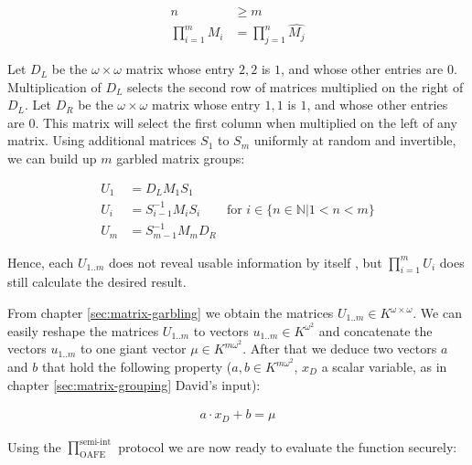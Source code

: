 \begin{align*}
n & \geq m \\
\prod_{i=1}^m M_i & = \prod_{j=1}^n \widehat{M_j}
\end{align*}

\label{sec:matrix-garbling}

Let $D_L$ be the $\omega \times \omega$ matrix whose entry $2,2$ is $1$, and
whose other entries are $0$. Multiplication of $D_L$ selects the second row of
matrices multiplied on the right of $D_L$. Let $D_R$ be the $\omega \times
\omega$ matrix whose entry $1,1$ is $1$, and whose other entries are $0$. This
matrix will select the first column when multiplied on the left of any matrix.
Using additional matrices $S_1$ to $S_{m}$ uniformly at random and invertible,
we can build up $m$ garbled matrix groups:

\begin{align*}
U_1 & = D_L M_1 S_1 \\
U_i & = S_{i-1}^{-1} M_i S_i &
\text{for $i \in \{n \in \mathbb{N} \big| 1 < n < m\}$}\\
U_m & = S_{m-1}^{-1} M_m D_R
\end{align*}

\noindent{} Hence, each $U_{1..m}$ does not reveal usable information by itself
\cite{cramer03}, but $\prod_{i=1}^m U_i$ does still calculate the desired
result.



From chapter \ref{sec:matrix-garbling} we obtain the matrices $U_{1..m} \in
K^{\omega \times \omega}$. We can easily reshape the matrices $U_{1..m}$ to
vectors $u_{1..m} \in K^{\omega^2}$ and concatenate the vectors $u_{1..m}$ to
one giant vector $\mu \in K^{m\omega^2}$. After that we deduce two vectors $a$
and $b$ that hold the following property ($a, b \in K^{m\omega^2}$, $x_D$ a
scalar variable, as in chapter \ref{sec:matrix-grouping} David's input):

\begin{align}
a \cdot x_D + b = \mu
\end{align}

Using the $\prod^{\text{semi-int}}_{\text{OAFE}}$ protocol\cite{davidgoliath} we
are now ready to evaluate the function securely:


